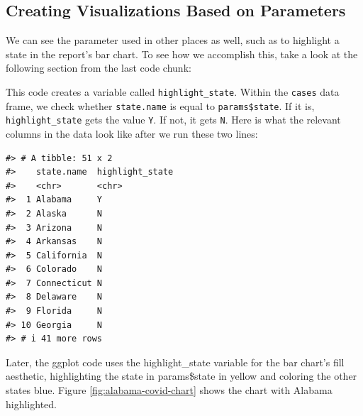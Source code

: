 \documentclass[
]{book}
\newenvironment{Shaded}{\begin{snugshade}}{\end{snugshade}}
\newcommand{\AttributeTok}[1]{\textcolor[rgb]{0.13,0.29,0.53}{#1}}
\newcommand{\FunctionTok}[1]{\textcolor[rgb]{0.13,0.29,0.53}{\textbf{#1}}}
\newcommand{\NormalTok}[1]{#1}
\newcommand{\SpecialCharTok}[1]{\textcolor[rgb]{0.81,0.36,0.00}{\textbf{#1}}}
\newcommand{\StringTok}[1]{\textcolor[rgb]{0.31,0.60,0.02}{#1}}
\begin{document}
\hypertarget{creating-visualizations-based-on-parameters}{%
\subsection*{Creating Visualizations Based on Parameters}\label{creating-visualizations-based-on-parameters}}

We can see the parameter used in other places as well, such as to highlight a state in the report's bar chart. To see how we accomplish this, take a look at the following section from the last code chunk:

\begin{Shaded}
\end{Shaded}

This code creates a variable called \texttt{highlight\_state}. Within the \texttt{cases} data frame, we check whether \texttt{state.name} is equal to \texttt{params\$state}. If it is, \texttt{highlight\_state} gets the value \texttt{Y}. If not, it gets \texttt{N}. Here is what the relevant columns in the data look like after we run these two lines:

\begin{verbatim}
#> # A tibble: 51 x 2
#>    state.name  highlight_state
#>    <chr>       <chr>          
#>  1 Alabama     Y              
#>  2 Alaska      N              
#>  3 Arizona     N              
#>  4 Arkansas    N              
#>  5 California  N              
#>  6 Colorado    N              
#>  7 Connecticut N              
#>  8 Delaware    N              
#>  9 Florida     N              
#> 10 Georgia     N              
#> # i 41 more rows
\end{verbatim}

Later, the ggplot code uses the highlight\_state variable for the bar chart's fill aesthetic, highlighting the state in params\$state in yellow and coloring the other states blue. Figure \ref{fig:alabama-covid-chart} shows the chart with Alabama highlighted.
\end{document}
